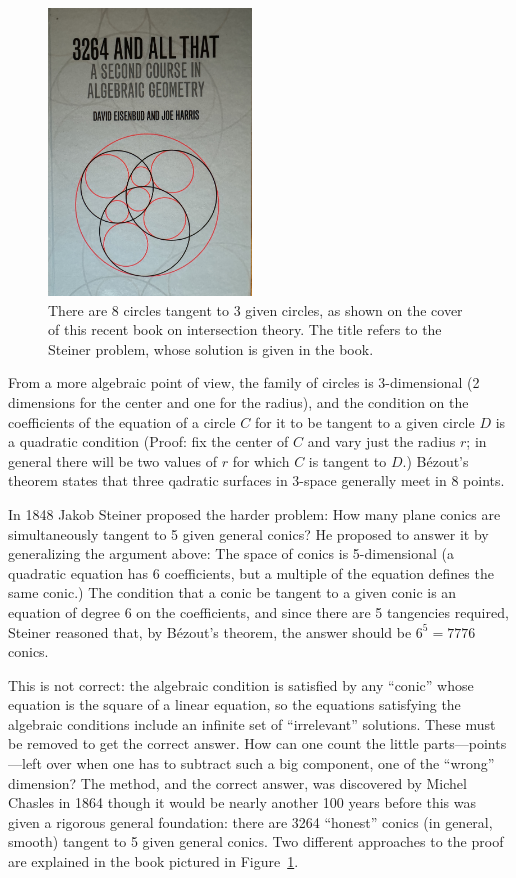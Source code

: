 \documentclass[11pt, oneside]{article}   	%
\begin{document}
\begin{figure}\label{3264Book}
\centerline {\includegraphics[height=3in]{3264Book.jpg}}
 \caption{There are 8 circles tangent to 3 given circles, as shown on the cover of this recent book
 on intersection theory. The title refers to the Steiner problem, whose solution is given in the book.}
\end{figure}

From a more algebraic point of view, the family of circles is 3-dimensional
(2 dimensions for the center and one for the radius), and the condition on the coefficients of the
equation of a circle $C$ for it to be tangent to a given circle $D$ is a quadratic condition (Proof: fix the center of $C$ and vary just the radius $r$; in general there will be two values of $r$ for which
$C$ is tangent to $D$.) B\'ezout's theorem states that three qadratic surfaces in 3-space generally
meet in 8 points.

In 1848 Jakob Steiner proposed the harder problem: How many plane conics are simultaneously tangent to 5 given general conics? He proposed to answer it by generalizing the argument above: The space of
conics is 5-dimensional (a quadratic equation has 6 coefficients, but a multiple of the equation defines the same conic.) The condition that a conic be tangent to a given conic is an equation of degree 6 on the coefficients, and since there are 5 tangencies required, Steiner reasoned that, by B\'ezout's theorem, the answer should be $6^{5} = 7776$ conics.

This is not correct: the algebraic condition is satisfied by any ``conic''  whose equation is the square of a linear equation, so the equations satisfying the algebraic conditions include an infinite set of ``irrelevant'' solutions. These must be removed to get the correct answer.
How can one count the little parts---points---left over when one has to subtract such a big component, one of the ``wrong'' dimension?
The method, and the correct answer, was discovered by Michel Chasles in 1864 though it would be nearly another 100 years before this was given a rigorous general foundation: there are 3264 ``honest'' conics (in general, smooth) tangent to 5 given general conics. Two different approaches to the proof are explained in the book pictured in 
Figure~\ref{3264Book}.
\end{document}
